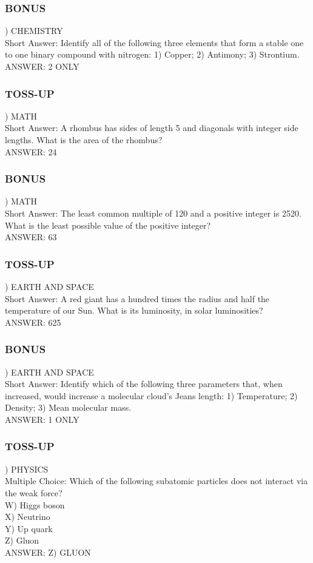 \documentclass{article}
\begin{document}
\subsubsection*{BONUS}
) CHEMISTRY \\
Short Answer: Identify all of the following three elements that form a stable one to one binary compound with nitrogen: 1) Copper; 2) Antimony; 3) Strontium. \\
ANSWER: 2 ONLY

\subsubsection*{TOSS-UP}
) MATH \\
Short Answer: A rhombus has sides of length 5 and diagonals with integer side lengths. What is the area of the rhombus? \\
ANSWER: 24

\subsubsection*{BONUS}
) MATH \\
Short Answer: The least common multiple of 120 and a positive integer is 2520. What is the least possible value of the positive integer? \\
ANSWER: 63

\newpage

\subsubsection*{TOSS-UP}
) EARTH AND SPACE \\
Short Answer: A red giant has a hundred times the radius and half the temperature of our Sun. What is its luminosity, in solar luminosities? \\
ANSWER: 625

\subsubsection*{BONUS}
) EARTH AND SPACE \\
Short Answer: Identify which of the following three parameters that, when increased, would increase a molecular cloud's Jeans length: 1) Temperature; 2) Density; 3) Mean molecular mass. \\
ANSWER: 1 ONLY

\subsubsection*{TOSS-UP}
) PHYSICS \\
Multiple Choice: Which of the following subatomic particles does not interact via the weak force? \\
W) Higgs boson \\
X) Neutrino \\
Y) Up quark \\
Z) Gluon \\
ANSWER: Z) GLUON
\end{document}
